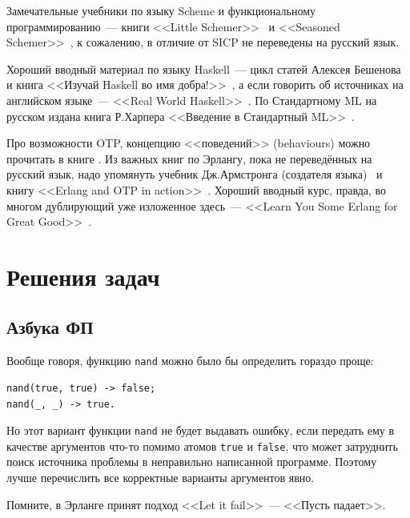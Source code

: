 \documentclass[
  paper=a4,
  fontsize=14pt,
  openany,
  appendixprefix=true
]{scrbook}
\begin{document}
Замечательные учебники по языку Scheme и функциональному программированию~--- книги <<Little Schemer>>~\cite{little_schemer} и <<Seasoned Schemer>>~\cite{seasoned_schemer}, к сожалению, в отличие от SICP не переведены на русский язык.

Хороший вводный материал по языку Haskell~--- цикл статей Алексея Бешенова~\cite{Beshenov} и книга <<Изучай Haskell во имя добра!>>~\cite{Lipovacha}, а если говорить об источниках на английском языке~--- <<Real World Haskell>>~\cite{real_world_haskell}. По Стандартному ML на русском издана книга Р.Харпера <<Введение в Стандартный ML>>~\cite{Harper}.

Про возможности OTP, концепцию <<поведений>> (behaviours) можно прочитать в книге \cite{cesarini}. Из важных книг по Эрлангу, пока не переведённых на русский язык, надо упомянуть учебник Дж.Армстронга (создателя языка)~\cite{armstrong} и книгу <<Erlang and OTP in action>>~\cite{OTP_in_action}. Хороший вводный курс, правда, во многом дублирующий уже изложенное здесь~--- <<Learn You Some Erlang for Great Good>>~\cite{LYSE}.

\chapter*{Решения задач}

\section*{Азбука ФП}




Вообще говоря, функцию \lstinline{nand} можно было бы определить гораздо проще:

\begin{lstlisting}
nand(true, true) -> false;
nand(_, _) -> true.
\end{lstlisting}

Но этот вариант функции \lstinline{nand} не будет выдавать ошибку, если передать ему в качестве аргументов что-то помимо атомов \lstinline{true} и \lstinline{false}, что может затруднить поиск источника проблемы в неправильно написанной программе. Поэтому лучше перечислить все корректные варианты аргументов явно.

Помните, в Эрланге принят подход <<Let it fail>>~--- <<Пусть падает>>.
\end{document}
